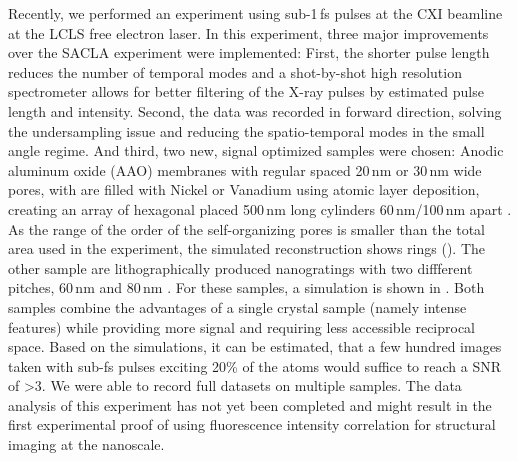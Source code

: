 Recently, we performed an experiment using sub-1\,fs pulses at the CXI beamline at the LCLS free electron laser. In this experiment, three major improvements over the SACLA experiment were implemented: First, the shorter pulse length reduces the number of temporal modes and a shot-by-shot high resolution spectrometer allows for better filtering of the X-ray pulses by estimated pulse length and intensity. Second, the data was recorded in forward direction, solving the undersampling issue and reducing the spatio-temporal modes in the small angle regime. And third, two new, signal optimized samples were chosen: Anodic aluminum oxide (AAO) membranes with regular spaced 20\,nm or 30\,nm wide pores, with are filled with Nickel or Vanadium using atomic layer deposition, creating an array of hexagonal placed 500\,nm long cylinders 60\,nm/100\,nm apart \cite{carina2019}. As the range of the order of the self-organizing pores is smaller than the total area used in the experiment, the simulated reconstruction shows rings (). 
The other sample are lithographically produced nanogratings with two diffferent pitches, 60\,nm  and 80\,nm \cite{mojarad2015}. For these samples, a simulation is shown in . Both samples combine the advantages of a single crystal sample (namely intense features) while providing more signal and requiring less accessible reciprocal space. 
Based on the simulations, it can be estimated, that a few hundred images taken with sub-fs pulses exciting 20\% of the atoms would suffice to reach a SNR of >3.
We were able to record full datasets on multiple samples. The data analysis of this experiment has not yet been completed and might result in the first experimental proof of using fluorescence intensity correlation for structural imaging at the nanoscale.  


